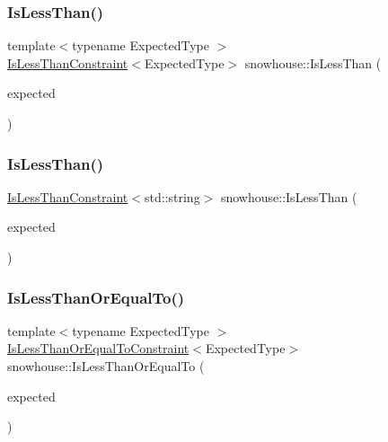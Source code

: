 \subsubsection{\texorpdfstring{IsLessThan()}{IsLessThan()}\hspace{0.1cm}{\footnotesize\ttfamily [1/2]}}
{\footnotesize\ttfamily template$<$typename Expected\+Type $>$ \\
\mbox{\hyperlink{structsnowhouse_1_1IsLessThanConstraint}{Is\+Less\+Than\+Constraint}}$<$Expected\+Type$>$ snowhouse\+::\+Is\+Less\+Than (\begin{DoxyParamCaption}\item[{const Expected\+Type \&}]{expected }\end{DoxyParamCaption})\hspace{0.3cm}{\ttfamily [inline]}}

\mbox{\label{namespacesnowhouse_a3649eb1115a0aa953744743363ea7349}} 
\subsubsection{\texorpdfstring{IsLessThan()}{IsLessThan()}\hspace{0.1cm}{\footnotesize\ttfamily [2/2]}}
{\footnotesize\ttfamily \mbox{\hyperlink{structsnowhouse_1_1IsLessThanConstraint}{Is\+Less\+Than\+Constraint}}$<$std\+::string$>$ snowhouse\+::\+Is\+Less\+Than (\begin{DoxyParamCaption}\item[{const char $\ast$}]{expected }\end{DoxyParamCaption})\hspace{0.3cm}{\ttfamily [inline]}}

\mbox{\label{namespacesnowhouse_a9e5d2797c368840b39f8f6664ce9621f}} 
\subsubsection{\texorpdfstring{IsLessThanOrEqualTo()}{IsLessThanOrEqualTo()}\hspace{0.1cm}{\footnotesize\ttfamily [1/2]}}
{\footnotesize\ttfamily template$<$typename Expected\+Type $>$ \\
\mbox{\hyperlink{structsnowhouse_1_1IsLessThanOrEqualToConstraint}{Is\+Less\+Than\+Or\+Equal\+To\+Constraint}}$<$Expected\+Type$>$ snowhouse\+::\+Is\+Less\+Than\+Or\+Equal\+To (\begin{DoxyParamCaption}\item[{const Expected\+Type \&}]{expected }\end{DoxyParamCaption})\hspace{0.3cm}{\ttfamily [inline]}}

